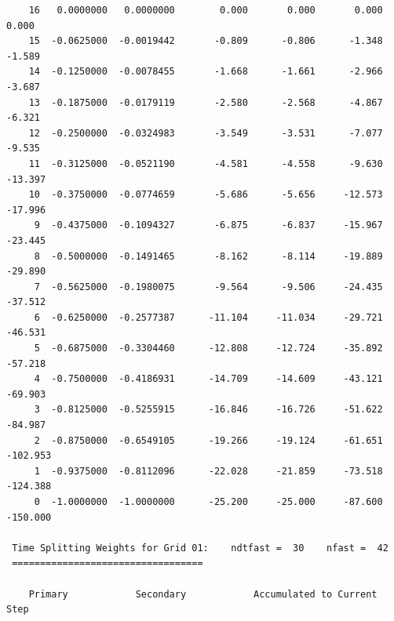 \begin{verbatim}
    16   0.0000000   0.0000000        0.000       0.000       0.000       0.000
    15  -0.0625000  -0.0019442       -0.809      -0.806      -1.348      -1.589
    14  -0.1250000  -0.0078455       -1.668      -1.661      -2.966      -3.687
    13  -0.1875000  -0.0179119       -2.580      -2.568      -4.867      -6.321
    12  -0.2500000  -0.0324983       -3.549      -3.531      -7.077      -9.535
    11  -0.3125000  -0.0521190       -4.581      -4.558      -9.630     -13.397
    10  -0.3750000  -0.0774659       -5.686      -5.656     -12.573     -17.996
     9  -0.4375000  -0.1094327       -6.875      -6.837     -15.967     -23.445
     8  -0.5000000  -0.1491465       -8.162      -8.114     -19.889     -29.890
     7  -0.5625000  -0.1980075       -9.564      -9.506     -24.435     -37.512
     6  -0.6250000  -0.2577387      -11.104     -11.034     -29.721     -46.531
     5  -0.6875000  -0.3304460      -12.808     -12.724     -35.892     -57.218
     4  -0.7500000  -0.4186931      -14.709     -14.609     -43.121     -69.903
     3  -0.8125000  -0.5255915      -16.846     -16.726     -51.622     -84.987
     2  -0.8750000  -0.6549105      -19.266     -19.124     -61.651    -102.953
     1  -0.9375000  -0.8112096      -22.028     -21.859     -73.518    -124.388
     0  -1.0000000  -1.0000000      -25.200     -25.000     -87.600    -150.000

 Time Splitting Weights for Grid 01:    ndtfast =  30    nfast =  42
 ==================================

    Primary            Secondary            Accumulated to Current Step


\end{verbatim}
